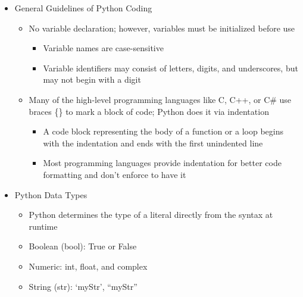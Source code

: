 \begin{itemize}

  \item General Guidelines of Python Coding

    \begin{itemize}

      \item No variable declaration; however, variables must be initialized before use

        \begin{itemize}

          \item Variable names are case-sensitive

          \item Variable identifiers may consist of letters, digits, and underscores, but may not begin with a digit

        \end{itemize}

      \item Many of the high-level programming languages like C, C++, or C# use braces \{\} to mark a block of code; Python does it via indentation

        \begin{itemize}

          \item A code block representing the body of a function or a loop begins with the indentation and ends with the first unindented line

          \item Most programming languages provide indentation for better code formatting and don't enforce to have it

        \end{itemize}

    \end{itemize}

  \item Python Data Types

    \begin{itemize}

      \item Python determines the type of a literal directly from the syntax at runtime

      \item Boolean (bool): True or False

      \item Numeric: int, float, and complex

      \item String (str): `myStr', ``myStr''

    \end{itemize}

\end{itemize}



